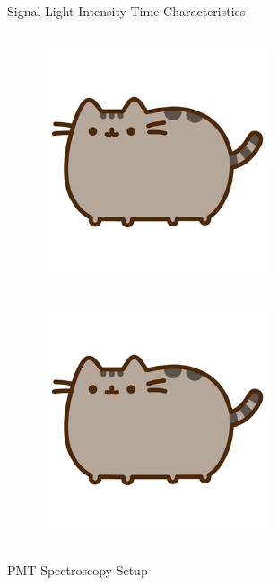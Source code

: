 \begin{columnframe}{Signal Light Intensity Time Characteristics}
    \begin{column}{0.5\textwidth}
        \begin{figure}
            \centering
            \includegraphics[width=0.6\textwidth, frame]{images/pusheen.png}
        \end{figure}
    \end{column}
    \begin{column}{0.5\textwidth}
        \begin{figure}
            \centering
            \includegraphics[width=0.6\textwidth, frame]{images/pusheen.png}
        \end{figure}
    \end{column}
\end{columnframe}

\begin{columnframe}{PMT Spectroscopy Setup}
    \begin{column}{0.5\textwidth}
    \end{column}
    \begin{column}{0.5\textwidth}
    \end{column}
\end{columnframe}

